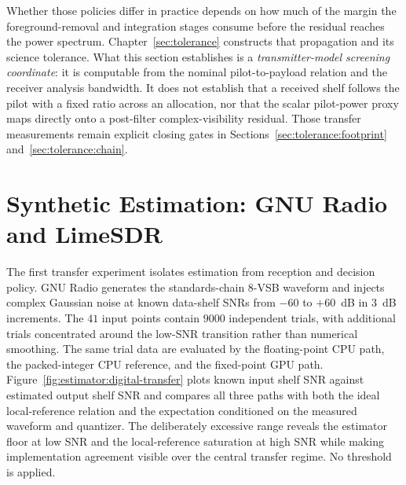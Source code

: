 Whether those policies differ in practice depends on how much of the margin the foreground-removal and integration stages consume before the residual reaches the power spectrum. Chapter~\ref{sec:tolerance} constructs that propagation and its science tolerance. What this section establishes is a \emph{transmitter-model screening coordinate}: it is computable from the nominal pilot-to-payload relation and the receiver analysis bandwidth. It does not establish that a received shelf follows the pilot with a fixed ratio across an allocation, nor that the scalar pilot-power proxy maps directly onto a post-filter complex-visibility residual. Those transfer measurements remain explicit closing gates in Sections~\ref{sec:tolerance:footprint} and~\ref{sec:tolerance:chain}.

\section{Synthetic Estimation: GNU Radio and LimeSDR}
\label{sec:estimator:validation}

The first transfer experiment isolates estimation from reception and decision policy. GNU Radio \cite{gnuradio} generates the standards-chain 8-VSB waveform and injects complex Gaussian noise at known data-shelf SNRs from $-60$ to $+60$~dB in $3$~dB increments. The $41$ input points contain $9000$ independent trials, with additional trials concentrated around the low-SNR transition rather than numerical smoothing. The same trial data are evaluated by the floating-point CPU path, the packed-integer CPU reference, and the fixed-point GPU path. Figure~\ref{fig:estimator:digital-transfer} plots known input shelf SNR against estimated output shelf SNR and compares all three paths with both the ideal local-reference relation and the expectation conditioned on the measured waveform and quantizer. The deliberately excessive range reveals the estimator floor at low SNR and the local-reference saturation at high SNR while making implementation agreement visible over the central transfer regime. No threshold is applied.

